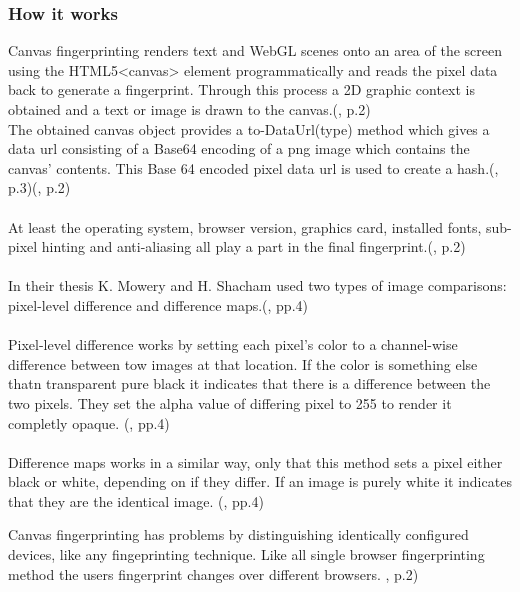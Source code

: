 \subsubsection{How it works}
Canvas fingerprinting renders text and WebGL scenes onto an area of the screen using the HTML5<canvas> element programmatically and reads the pixel data back to generate a fingerprint. Through this process a 2D graphic context is obtained and a text or image is drawn to the canvas.(\textcite{upi15}, p.2)\\
The obtained canvas object provides a to-DataUrl(type) method which gives a data url consisting of a Base64 encoding of a png image which contains the canvas' contents. This Base 64 encoded pixel data url is used to create a hash.(\textcite{mowery12}, p.3)(\textcite{upi15}, p.2)\\\\
At least the operating system, browser version, graphics card, installed fonts, sub-pixel hinting and anti-aliasing all play a part in the final fingerprint.(\textcite{upi15}, p.2) \\\\
In their thesis K. Mowery and H. Shacham used two types of image comparisons: pixel-level difference and difference maps.(\textcite{mowery12}, pp.4)\\\\
Pixel-level difference works by setting each pixel's color to a channel-wise difference between tow images at that location. If the color is something else thatn transparent pure black it indicates that there is a difference between the two pixels. They set the alpha value of differing pixel to 255 to render it completly opaque. (\textcite{mowery12}, pp.4)\\\\
Difference maps works in a similar way, only that this method sets a pixel either black or white, depending on if they differ. If an image is purely white it indicates that they are the identical image. (\textcite{mowery12}, pp.4)

Canvas fingerprinting has problems by distinguishing identically configured devices, like any fingeprinting technique. Like all single browser fingerprinting method the users fingerprint changes over different browsers. \textcite{upi15}, p.2)

